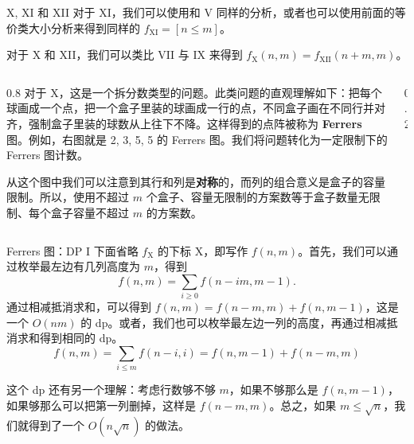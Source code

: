 \begin{frame}{X, XI 和 XII}
    对于 XI，我们可以使用和 V 同样的分析，或者也可以使用前面的等价类大小分析来得到同样的 $f_{\mathrm{XI}}=[n\le m]$。

    对于 X 和 XII，我们可以类比 VII 与 IX 来得到 $f_{\mathrm{X}}(n,m)=f_{\mathrm{XII}}(n+m,m)$。

    \vspace{0.5em}

    \begin{columns}[T, onlytextwidth]

    \begin{column}{0.8\textwidth}
    对于 X，这是一个拆分数类型的问题。此类问题的直观理解如下：把每个球画成一个点，把一个盒子里装的球画成一行的点，不同盒子画在不同行并对齐，强制盒子里装的球数从上往下不降。这样得到的点阵被称为 \textbf{Ferrers} 图。例如，右图就是 2, 3, 5, 5 的 Ferrers 图。我们将问题转化为一定限制下的 Ferrers 图计数。

    \vspace{1em}

    从这个图中我们可以注意到其行和列是\textbf{对称}的，而列的组合意义是盒子的容量限制。所以，使用不超过 $m$ 个盒子、容量无限制的方案数等于盒子数量无限制、每个盒子容量不超过 $m$ 的方案数。
    \end{column}

    \begin{column}{0.2\textwidth}
        \vspace{1cm}
    
        \centering


    \end{column}
    \end{columns}
\end{frame}
\begin{frame}{Ferrers 图：DP I}
            下面省略 $f_{\mathrm{X}}$ 的下标 X，即写作 $f(n,m)$。首先，我们可以通过枚举最左边有几列高度为 $m$，得到
            $$
            f(n,m)=\sum_{i\ge 0}f(n-im,m-1).
            $$ 
            通过相减抵消求和，可以得到 $f(n,m)=f(n-m,m)+f(n,m-1)$，这是一个 $O(nm)$ 的 dp。或者，我们也可以枚举最左边一列的高度，再通过相减抵消求和得到相同的 dp。
            $$
            f(n,m)=\sum_{i\le m}f(n-i,i)=f(n,m-1)+f(n-m,m)
            $$

            这个 dp 还有另一个理解：考虑行数够不够 $m$，如果不够那么是 $f(n,m-1)$，如果够那么可以把第一列删掉，这样是 $f(n-m,m)$。总之，如果 $m\le \sqrt{n}$，我们就得到了一个 $O(n\sqrt{n})$ 的做法。
\end{frame}
